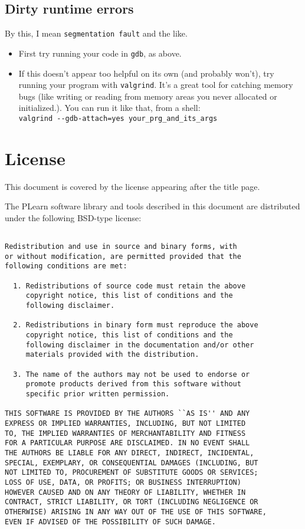 \documentclass[11pt]{book}
\begin{document}
\section{Dirty runtime errors}

By this, I mean {\tt segmentation fault} and the like.

\begin{itemize}
\item First try running your code in {\tt gdb}, as above.
\item If this doesn't appear too helpful on its own (and probably won't),
  try running your program with {\tt valgrind}. It's a great tool for
  catching memory bugs (like writing or reading from memory areas you never
  allocated or initialized.). You can run it like that, from a shell: \\
  \verb!valgrind --gdb-attach=yes your_prg_and_its_args!
\end{itemize}



\chapter*{License}

This document is covered by the license appearing after the title page.

The PLearn software library and tools described in this document are
distributed under the following BSD-type license:

\begin{verbatim}

Redistribution and use in source and binary forms, with
or without modification, are permitted provided that the
following conditions are met:

  1. Redistributions of source code must retain the above
     copyright notice, this list of conditions and the
     following disclaimer.

  2. Redistributions in binary form must reproduce the above
     copyright notice, this list of conditions and the
     following disclaimer in the documentation and/or other
     materials provided with the distribution.

  3. The name of the authors may not be used to endorse or
     promote products derived from this software without
     specific prior written permission.

THIS SOFTWARE IS PROVIDED BY THE AUTHORS ``AS IS'' AND ANY
EXPRESS OR IMPLIED WARRANTIES, INCLUDING, BUT NOT LIMITED
TO, THE IMPLIED WARRANTIES OF MERCHANTABILITY AND FITNESS
FOR A PARTICULAR PURPOSE ARE DISCLAIMED. IN NO EVENT SHALL
THE AUTHORS BE LIABLE FOR ANY DIRECT, INDIRECT, INCIDENTAL,
SPECIAL, EXEMPLARY, OR CONSEQUENTIAL DAMAGES (INCLUDING, BUT
NOT LIMITED TO, PROCUREMENT OF SUBSTITUTE GOODS OR SERVICES;
LOSS OF USE, DATA, OR PROFITS; OR BUSINESS INTERRUPTION)
HOWEVER CAUSED AND ON ANY THEORY OF LIABILITY, WHETHER IN
CONTRACT, STRICT LIABILITY, OR TORT (INCLUDING NEGLIGENCE OR
OTHERWISE) ARISING IN ANY WAY OUT OF THE USE OF THIS SOFTWARE,
EVEN IF ADVISED OF THE POSSIBILITY OF SUCH DAMAGE.
\end{verbatim}
\end{document}
